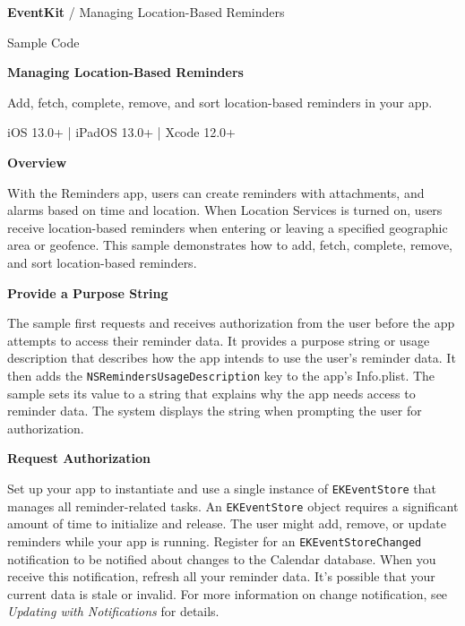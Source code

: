 \documentclass{article}
\title{}
\author{}
\date{}
\begin{document}
\noindent
\textbf{EventKit} / Managing Location-Based Reminders

\noindent
Sample Code

\noindent
\textbf{Managing Location-Based Reminders}

\noindent
Add, fetch, complete, remove, and sort location-based reminders in your app.

\noindent
{}

\noindent
iOS 13.0+ | iPadOS 13.0+ | Xcode 12.0+

\noindent
\textbf{Overview}

\noindent
With the Reminders app, users can create reminders with attachments, and alarms based on time and location. When Location Services is turned on, users receive location-based reminders when entering or leaving a specified geographic area or geofence. This sample demonstrates how to add, fetch, complete, remove, and sort location-based reminders.

\noindent
\textbf{Provide a Purpose String}

\noindent
The sample first requests and receives authorization from the user before the app attempts to access their reminder data. It provides a purpose string or usage description that describes how the app intends to use the user's reminder data. It then adds the \texttt{NSRemindersUsageDescription} key to the app's Info.plist. The sample sets its value to a string that explains why the app needs access to reminder data. The system displays the string when prompting the user for authorization.

\noindent
{}

\noindent
\textbf{Request Authorization}

\noindent
Set up your app to instantiate and use a single instance of \texttt{EKEventStore} that manages all reminder-related tasks. An \texttt{EKEventStore} object requires a significant amount of time to initialize and release. The user might add, remove, or update reminders while your app is running. Register for an \texttt{EKEventStoreChanged} notification to be notified about changes to the Calendar database. When you receive this notification, refresh all your reminder data. It's possible that your current data is stale or invalid. For more information on change notification, see \textit{Updating with Notifications} for details.
\end{document}
